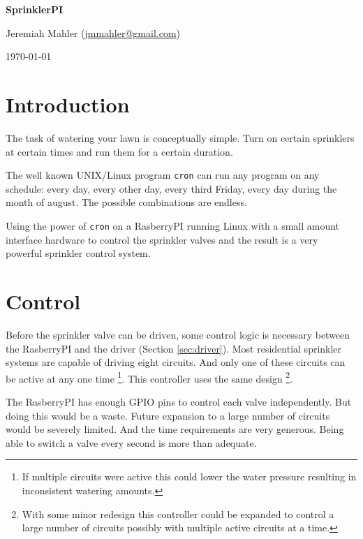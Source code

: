 \documentclass{article}
\begin{document}
\VerbatimFootnotes


\thispagestyle{empty}

\centerline{\Large \textbf{SprinklerPI}}
\vspace{0.1in}
\centerline{\normalsize {Jeremiah Mahler} ({\href{mailto:jmmahler@gmail.com}{jmmahler@gmail.com}})}
\centerline{\small \today}
\vspace{0.2in}



\section{Introduction}

The task of watering your lawn is conceptually simple.
Turn on certain sprinklers at certain times and run them for
a certain duration.

The well known UNIX/Linux program \verb+cron+ can run any program
on any schedule: every day, every other day, every third Friday,
every day during the month of august.  The possible combinations
are endless.

Using the power of \verb+cron+ on a RasberryPI\autocite{rasberrypi}
running Linux with a small amount interface hardware to control the
sprinkler valves and the result is a very powerful sprinkler control system.


\clearpage
\section{Control}
\label{sec:control}

Before the sprinkler valve can be driven, some control logic is necessary
between the RasberryPI and the driver (Section \ref{sec:driver}).
Most residential sprinkler systems are capable of driving eight circuits.
And only one of these circuits can be active at any one time
\footnote{If multiple circuits were active this could lower the
water pressure resulting in inconsistent watering amounts.}.
This controller uses the same design
\footnote{With some minor redesign this controller could be
expanded to control a large number of circuits possibly
with multiple active circuits at a time.}.

The RasberryPI has enough GPIO pins to control each valve independently.
But doing this would be a waste.
Future expansion to a large number of circuits would be severely limited.
And the time requirements are very generous.
Being able to switch a valve every second is more than adequate.
\end{document}
